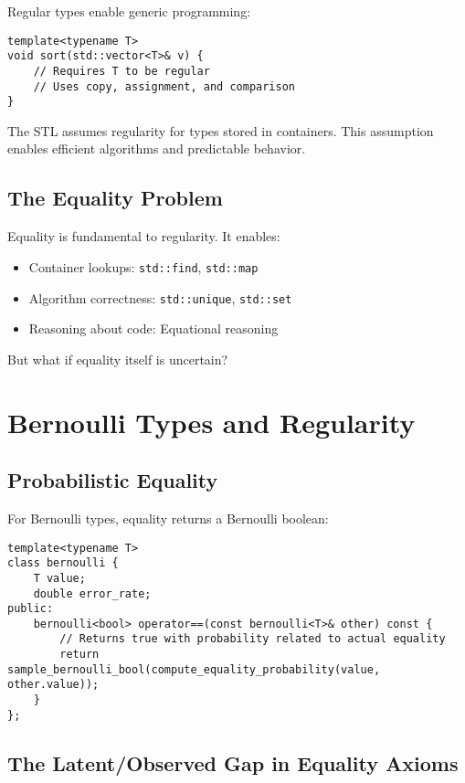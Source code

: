 \documentclass[11pt,final,hidelinks]{article}
\newcommand{\code}[1]{\texttt{#1}}
\begin{document}
Regular types enable generic programming:

\begin{verbatim}
template<typename T>
void sort(std::vector<T>& v) {
    // Requires T to be regular
    // Uses copy, assignment, and comparison
}
\end{verbatim}

The STL assumes regularity for types stored in containers. This assumption enables efficient algorithms and predictable behavior.

\subsection{The Equality Problem}

Equality is fundamental to regularity. It enables:
\begin{itemize}
    \item Container lookups: \code{std::find}, \code{std::map}
    \item Algorithm correctness: \code{std::unique}, \code{std::set}
    \item Reasoning about code: Equational reasoning
\end{itemize}

But what if equality itself is uncertain?

\section{Bernoulli Types and Regularity}

\subsection{Probabilistic Equality}

For Bernoulli types, equality returns a Bernoulli boolean:

\begin{verbatim}
template<typename T>
class bernoulli {
    T value;
    double error_rate;
public:
    bernoulli<bool> operator==(const bernoulli<T>& other) const {
        // Returns true with probability related to actual equality
        return sample_bernoulli_bool(compute_equality_probability(value, other.value));
    }
};
\end{verbatim}

\subsection{The Latent/Observed Gap in Equality Axioms}
\end{document}
